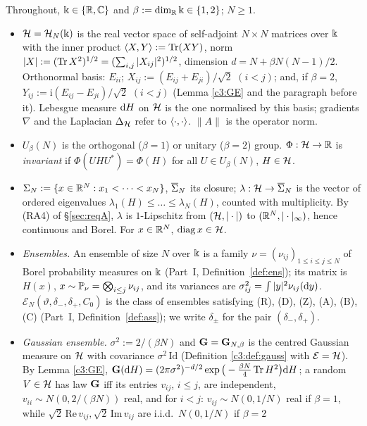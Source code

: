 Throughout, $\Bbbk\in\{\mathbb{R},\mathbb{C}\}$ and $\beta:=\dim_{\mathbb{R}}\Bbbk\in\{1,2\}$; $N\ge 1$.
\begin{itemize}[leftmargin=1.6em,itemsep=2pt]
\item $\mathcal{H}=\mathcal{H}_N(\Bbbk)$ is the real vector space of self-adjoint $N\times N$ matrices over $\Bbbk$ with the inner product
$\langle X,Y\rangle:=\operatorname{Tr}(XY)$, norm $|X|:=(\operatorname{Tr} X^2)^{1/2}=(\sum_{i,j}|X_{ij}|^2)^{1/2}$, dimension $d=N+\beta N(N-1)/2$.
Orthonormal basis: $E_{ii}$; $X_{ij}:=(E_{ij}+E_{ji})/\sqrt2$ $(i<j)$; and, if $\beta=2$, $Y_{ij}:=\mathrm{i}(E_{ij}-E_{ji})/\sqrt2$ $(i<j)$ (Lemma \ref{c3:GE} and the paragraph before it).
Lebesgue measure $\mathrm{d} H$ on $\mathcal{H}$ is the one normalised by this basis; gradients $\nabla$ and the Laplacian $\Delta_{\mathcal{H}}$ refer to $\langle\cdot,\cdot\rangle$. $\|A\|$ is the operator norm.
\item $U_\beta(N)$ is the orthogonal ($\beta=1$) or unitary ($\beta=2$) group. $\Phi:\mathcal{H}\to\mathbb{R}$ is \emph{invariant} if $\Phi(UHU^*)=\Phi(H)$ for all $U\in U_\beta(N)$, $H\in\mathcal{H}$.
\item $\Sigma_N:=\{x\in\mathbb{R}^N:x_1<\dots<x_N\}$, $\overline{\Sigma}_N$ its closure; $\lambda:\mathcal{H}\to\overline{\Sigma}_N$ is the vector of ordered eigenvalues
$\lambda_1(H)\le\dots\le\lambda_N(H)$, counted with multiplicity. By (RA4) of \S\ref{sec:reqA}, $\lambda$ is $1$-Lipschitz from $(\mathcal{H},|\cdot|)$ to $(\mathbb{R}^N,|\cdot|_\infty)$, hence continuous and Borel. For $x\in\mathbb{R}^N$, $\operatorname{diag} x\in\mathcal{H}$.
\item \emph{Ensembles.} An ensemble of size $N$ over $\Bbbk$ is a family $\nu=(\nu_{ij})_{1\le i\le j\le N}$ of Borel probability measures on $\Bbbk$ (Part~I, Definition~\ref{def:ens}); its matrix is $H(x)$, $x\sim\mathbb{P}_\nu=\bigotimes_{i\le j}\nu_{ij}$, and its variances are $\sigma_{ij}^2=\int|y|^2\nu_{ij}(\mathrm{d} y)$.
$\mathcal E_N(\vartheta,\delta_-,\delta_+,C_0)$ is the class of ensembles satisfying (R), (D), (Z), (A), (B), (C) (Part~I, Definition~\ref{def:ass}); we write $\delta_\pm$ for the pair $(\delta_-,\delta_+)$.
\item \emph{Gaussian ensemble.} $\sigma^2:=2/(\beta N)$ and $\mathbf{G}=\mathbf{G}_{N,\beta}$ is the centred Gaussian measure on $\mathcal{H}$ with covariance $\sigma^2\,\mathrm{Id}$ (Definition \ref{c3:def:gauss} with $\mathcal E=\mathcal{H}$). By Lemma \ref{c3:GE}, $\mathbf{G}(\mathrm{d} H)=(2\pi\sigma^2)^{-d/2}\exp\big(-\tfrac{\beta N}{4}\operatorname{Tr} H^2\big)\mathrm{d} H$;
a random $V\in\mathcal{H}$ has law $\mathbf{G}$ iff its entries $v_{ij}$, $i\le j$, are independent, $v_{ii}\sim N(0,2/(\beta N))$ real,
and for $i<j$: $v_{ij}\sim N(0,1/N)$ real if $\beta=1$, while $\sqrt2\,\mathrm{Re}\,v_{ij},\sqrt2\,\mathrm{Im}\,v_{ij}$ are i.i.d.\ $N(0,1/N)$ if $\beta=2$

\end{itemize}
